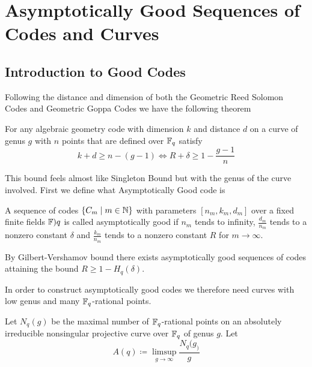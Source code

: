 \chapter{Asymptotically Good Sequences of Codes and Curves}
\section{Introduction to Good Codes}
Following the distance and dimension of both the Geometric Reed Solomon Codes and Geometric Goppa Codes we have the following theorem
\begin{theorem}
	For any algebraic geometry code with dimension $k$ and distance $d$ on a curve of genus $g$ with $n$ points that are defined over $\mathbb{F}_q$ satisfy $$k+d\geq n-(g-1)\iff R+\delta \geq 1-\frac{g-1}{n}$$
\end{theorem}
This bound feels almost like Singleton Bound but with the genus of the curve involved. First we define what Asymptotically Good code is
\begin{definition}
	A sequence of codes $\{C_m\mid m\in \mathbb{N}\}$ with parameters $[n_m,k_m,d_m]$ over a fixed finite fields $\mathbb{F})q$ is called asymptotically good if  $n_m$ tends to infinity, $\frac{d_m}{n_m}$ tends to a nonzero constant $\delta$ and $\frac{k_m}{n_m}$ tends to a nonzero constant $R$ for $m\to \infty$.
\end{definition}By Gilbert-Vershamov bound there exists asymptotically good sequences of codes attaining the bound $R\geq 1-H_q(\delta)$. 

In order to construct asymptotically good codes we therefore need curves with low genus and many $\mathbb{F}_q$-rational points.
\begin{definition}
	Let $N_q(g)$ be the maximal number of $\mathbb{F}_q$-rational points on an absolutely irreducible nonsingular projective curve over $\mathbb{F}_q$ of genus $g$. Let $$A(q)\coloneqq \limsup_{g\to \infty}\frac{N_q(g_)}{g}$$
\end{definition}

